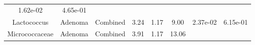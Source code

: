 \documentclass[12pt,]{article}
\begin{document}
\begin{longtable}[]{@{}cccccccc@{}}
\begin{minipage}[t]{0.06\columnwidth}
1.62e-02\strut
\end{minipage} & \begin{minipage}[t]{0.06\columnwidth}\centering\strut
4.65e-01\strut
\end{minipage}\tabularnewline
\begin{minipage}[t]{0.18\columnwidth}\centering\strut
Lactococcus\strut
\end{minipage} & \begin{minipage}[t]{0.07\columnwidth}\centering\strut
Adenoma\strut
\end{minipage} & \begin{minipage}[t]{0.09\columnwidth}\centering\strut
Combined\strut
\end{minipage} & \begin{minipage}[t]{0.03\columnwidth}\centering\strut
3.24\strut
\end{minipage} & \begin{minipage}[t]{0.14\columnwidth}\centering\strut
1.17\strut
\end{minipage} & \begin{minipage}[t]{0.14\columnwidth}\centering\strut
9.00\strut
\end{minipage} & \begin{minipage}[t]{0.06\columnwidth}\centering\strut
2.37e-02\strut
\end{minipage} & \begin{minipage}[t]{0.06\columnwidth}\centering\strut
6.15e-01\strut
\end{minipage}\tabularnewline
\begin{minipage}[t]{0.18\columnwidth}\centering\strut
Micrococcaceae\strut
\end{minipage} & \begin{minipage}[t]{0.07\columnwidth}\centering\strut
Adenoma\strut
\end{minipage} & \begin{minipage}[t]{0.09\columnwidth}\centering\strut
Combined\strut
\end{minipage} & \begin{minipage}[t]{0.03\columnwidth}\centering\strut
3.91\strut
\end{minipage} & \begin{minipage}[t]{0.14\columnwidth}\centering\strut
1.17\strut
\end{minipage} & \begin{minipage}[t]{0.14\columnwidth}\centering\strut
13.06\strut
\end{minipage} & \begin{minipage}[t]{0.06\columnwidth}\centering\strut

\end{minipage}
\end{longtable}
\end{document}

